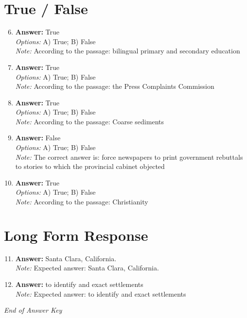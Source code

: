 \documentclass[12pt]{article}
\begin{document}
\section*{True / False}
\begin{enumerate}[label=\arabic*.]
\setcounter{enumi}{5}
\item \textbf{Answer:} True
\\ \textit{Options:} A) True; B) False
\\ \textit{Note:} According to the passage: bilingual primary and secondary education
\item \textbf{Answer:} True
\\ \textit{Options:} A) True; B) False
\\ \textit{Note:} According to the passage: the Press Complaints Commission
\item \textbf{Answer:} True
\\ \textit{Options:} A) True; B) False
\\ \textit{Note:} According to the passage: Coarse sediments
\item \textbf{Answer:} False
\\ \textit{Options:} A) True; B) False
\\ \textit{Note:} The correct answer is: force newspapers to print government rebuttals to stories to which the provincial cabinet objected
\item \textbf{Answer:} True
\\ \textit{Options:} A) True; B) False
\\ \textit{Note:} According to the passage: Christianity
\end{enumerate}

\section*{Long Form Response}
\begin{enumerate}[label=\arabic*.]
\setcounter{enumi}{10}
\item \textbf{Answer:} Santa Clara, California.
\\ \textit{Note:} Expected answer: Santa Clara, California.
\item \textbf{Answer:} to identify and exact settlements
\\ \textit{Note:} Expected answer: to identify and exact settlements
\end{enumerate}

\vfill
\noindent\textit{End of Answer Key}
\end{document}
